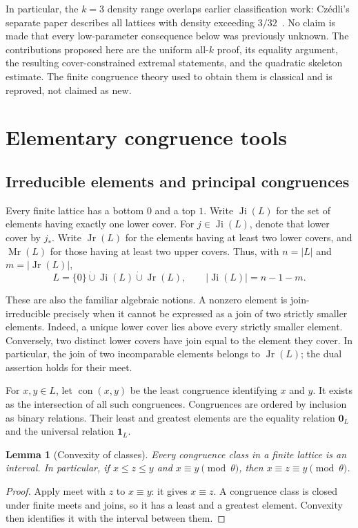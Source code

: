 \documentclass[11pt,a4paper]{article}
\numberwithin{equation}{section}
\newtheorem{lemma}[theorem]{Lemma}
\theoremstyle{definition}
\theoremstyle{remark}
\DeclareMathOperator{\con}{con}
\DeclareMathOperator{\Ji}{Ji}
\DeclareMathOperator{\Jr}{Jr}
\DeclareMathOperator{\Mr}{Mr}
\newcommand{\eqcon}{\mathbf 0_L}
\newcommand{\allcon}{\mathbf 1_L}
\newcommand{\card}[1]{\lvert #1\rvert}
\begin{document}
In particular, the $k=3$ density range overlaps earlier classification work:
Cz\'edli's separate paper describes all lattices with density exceeding
$3/32$~\cite{czedli332}. No claim is made that every low-parameter consequence
below was previously unknown. The contributions proposed here are the uniform
all-$k$ proof, its equality argument, the resulting cover-constrained extremal
statements, and the quadratic skeleton estimate. The finite congruence theory
used to obtain them is classical and is reproved, not claimed as new.

\section{Elementary congruence tools}\label{sec:tools}
\subsection{Irreducible elements and principal congruences}
Every finite lattice has a bottom $0$ and a top $1$.
Write $\Ji(L)$ for the set of elements having exactly one lower cover.
For $j\in\Ji(L)$, denote that lower cover by $j_*$. Write $\Jr(L)$ for the
elements having at least two lower covers, and $\Mr(L)$ for those having at
least two upper covers. Thus, with $n=\card L$ and $m=\card{\Jr(L)}$,
\begin{equation}\label{eq:partition-elements}
 L=\{0\}\mathbin{\dot\cup}\Ji(L)\mathbin{\dot\cup}\Jr(L),
 \qquad \card{\Ji(L)}=n-1-m.
\end{equation}

These are also the familiar algebraic notions. A nonzero element is
join-irreducible precisely when it cannot be expressed as a join of two strictly
smaller elements. Indeed, a unique lower cover lies above every strictly smaller
element. Conversely, two distinct lower covers have join equal to the element
they cover. In particular, the join of two incomparable elements belongs to
$\Jr(L)$; the dual assertion holds for their meet.

For $x,y\in L$, let $\con(x,y)$ be the least congruence identifying $x$ and $y$.
It exists as the intersection of all such congruences. Congruences are ordered
by inclusion as binary relations. Their least and greatest elements are the
equality relation $\eqcon$ and the universal relation $\allcon$.

\begin{lemma}[Convexity of classes]\label{lem:convex}
Every congruence class in a finite lattice is an interval. In particular, if
$x\le z\le y$ and $x\equiv y\pmod\theta$, then $x\equiv z\equiv y\pmod\theta$.
\end{lemma}
\begin{proof}
Apply meet with $z$ to $x\equiv y$: it gives $x\equiv z$.
A congruence class is closed under finite meets and joins, so it has a least and
a greatest element. Convexity then identifies it with the interval between them.
\end{proof}
\end{document}
